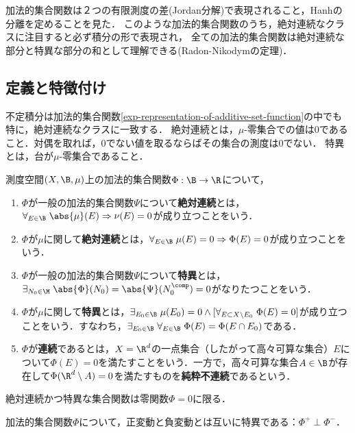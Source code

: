 \documentclass[uplatex, dvipdfmx]{jsreport}
\begin{document}
\begin{tcolorbox}[colframe=ForestGreen, colback=ForestGreen!10!white,breakable,colbacktitle=ForestGreen!40!white,coltitle=black,fonttitle=\bfseries\sffamily,
title=]
    加法的集合関数は２つの有限測度の差(Jordan分解)で表現されること，Hanhの分離を定めることを見た．
    このような加法的集合関数のうち，絶対連続なクラスに注目すると必ず積分の形で表現され，
    全ての加法的集合関数は絶対連続な部分と特異な部分の和として理解できる(Radon-Nikodymの定理)．
\end{tcolorbox}

\subsection{定義と特徴付け}

\begin{tcolorbox}[colframe=ForestGreen, colback=ForestGreen!10!white,breakable,colbacktitle=ForestGreen!40!white,coltitle=black,fonttitle=\bfseries\sffamily,
title=]
    不定積分は加法的集合関数\ref{exp-representation-of-additive-set-function}の中でも特に，絶対連続なクラスに一致する．
    絶対連続とは，$\mu$-零集合での値は$0$であること．対偶を取れば，$0$でない値を取るならばその集合の測度は$0$でない．
    特異とは，台が$\mu$-零集合であること．
\end{tcolorbox}

\begin{definition}
    測度空間$(X,\B,\mu)$上の加法的集合関数$\Phi:\B\to\R$について，
    \begin{enumerate}
        \item $\Phi$が一般の加法的集合関数$\Psi$について\textbf{絶対連続}とは，$\forall_{E\in\B}\;\abs{\mu}(E)\Rightarrow\nu(E)=0$が成り立つことをいう．
        \item $\Phi$が$\mu$に関して\textbf{絶対連続}とは，$\forall_{E\in\B}\;\mu(E)=0\Rightarrow\Phi(E)=0$が成り立つことをいう．
        \item $\Phi$が一般の加法的集合関数$\Psi$について\textbf{特異}とは，$\exists_{N_0\in\M}\;\abs{\Phi}(N_0)=\abs{\Psi}(N_0^\comp)=0$がなりたつことをいう．
        \item $\Phi$が$\mu$に関して\textbf{特異}とは，$\exists_{E_0\in\B}\;\mu(E_0)=0\land[\forall_{E\subset X\setminus E_0}\;\Phi(E)=0]$が成り立つことをいう．すなわち，$\exists_{E_0\in\B}\;\forall_{E\in\B}\;\Phi(E)=\Phi(E\cap E_0)$である．
        \item $\Phi$が\textbf{連続}であるとは，$X=\R^d$の一点集合（したがって高々可算な集合）$E$について$\Phi(E)=0$を満たすことをいう．一方で，高々可算な集合$A\in\B$が存在して$\Phi(\R^d\setminus A)=0$を満たすものを\textbf{純粋不連続}であるという．
    \end{enumerate}
    絶対連続かつ特異な集合関数は零関数$\Phi=0$に限る．
\end{definition}
\begin{example}
    加法的集合関数$\Phi$について，正変動と負変動とは互いに特異である：$\Phi^+\perp\Phi^-$．
\end{example}
\end{document}
